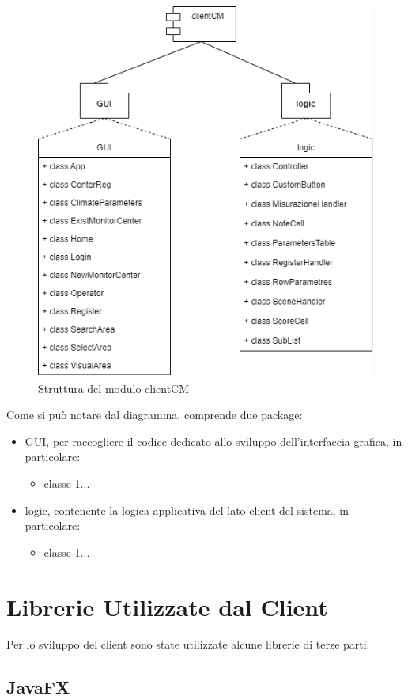\begin{figure}[h]
	\centering
	\caption{Struttura del modulo clientCM}
	\label{fig:clientcm}
	\includegraphics[width=0.8\linewidth]{../../fig/img/tecnico/clientCM.drawio}
\end{figure}

\pagebreak
Come si può notare dal diagramma, comprende due package:
\begin{itemize}
	\item GUI, per raccogliere il codice dedicato allo sviluppo dell'interfaccia grafica, in particolare:
	\begin{itemize}
		\item classe 1...
	\end{itemize}
	\item logic, contenente la logica applicativa del lato client del sistema, in particolare:
	\begin{itemize}
		\item classe 1...
	\end{itemize}
\end{itemize}

\section{Librerie Utilizzate dal Client}
Per lo sviluppo del client sono state utilizzate alcune librerie di terze parti.
\subsection{JavaFX}

